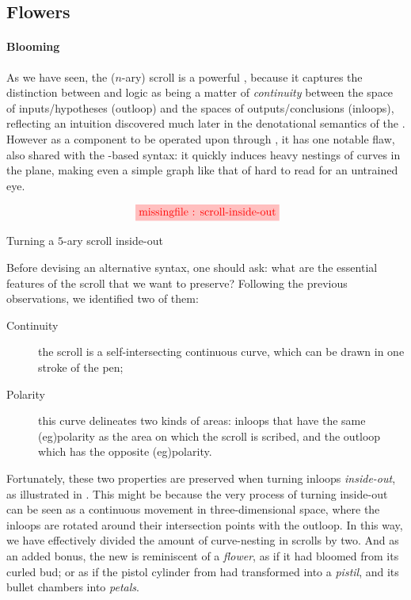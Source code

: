 \begin{scope}
\section{Flowers}

\paragraph{Blooming}

As we have seen, the ($n$-ary) scroll is a powerful , because it captures
the distinction between  and  logic as being a matter of
\emph{continuity} between the space of inputs/hypotheses (outloop) and the
spaces of outputs/conclusions (inloops), reflecting an intuition discovered much
later in the denotational semantics of the . However as a
 component to be operated upon through , it has
one notable flaw, also shared with the  -based syntax: it quickly
induces heavy nestings of curves in the plane, making even a simple graph like
that of  hard to read for an untrained eye.

\begin{marginfigure}
  $$
  \tikzfig{1}{0.4}{scroll-inside-out}
  $$
  \caption{Turning a $5$-ary scroll inside-out}
\end{marginfigure}

Before devising an alternative syntax, one should ask: what are the essential
features of the scroll that we want to preserve? Following the previous
observations, we identified two of them:
\begin{description}
  \item[Continuity] the scroll is a self-intersecting continuous curve,
  which can be drawn in one stroke of the pen;
  \item[Polarity] this curve delineates two kinds of areas: inloops that have
  the same \kl(eg){polarity} as the area on which the scroll is scribed, and the outloop
  which has the opposite \kl(eg){polarity}.
\end{description}

Fortunately, these two properties are preserved when turning inloops
\emph{inside-out}, as illustrated in . This might be
because the very process of turning inside-out can be seen as a continuous
movement in three-dimensional space, where the inloops are rotated around their
intersection points with the outloop. In this way, we have effectively divided
the amount of curve-nesting in scrolls by two. And as an added bonus, the new
 is reminiscent of a \emph{flower}, as if it had bloomed from its curled
bud; or as if the pistol cylinder from  had transformed into
a \emph{pistil}, and its bullet chambers into \emph{petals}.


\end{scope}
